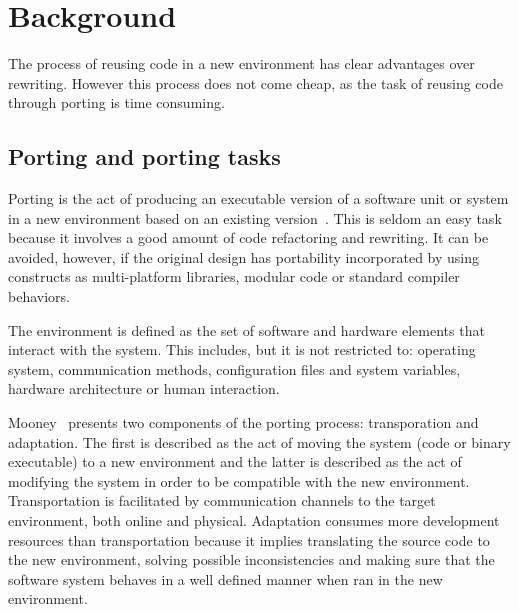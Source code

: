 \section{Background} \label{sec:background}

The process of reusing code in a new environment has clear advantages over
rewriting. However this process does not come cheap, as the task of reusing code
through porting is time consuming.

\subsection{Porting and porting tasks}

Porting is the act of producing an executable version of a software unit or
system in a new environment based on an existing version~\cite{b7}. This is
seldom an easy task because it involves a good amount of code refactoring and
rewriting. It can be avoided, however, if the original design has portability
incorporated by using constructs as multi-platform libraries, modular code or
standard compiler behaviors.

The environment is defined as the set of software and hardware elements that
interact with the system. This includes, but it is not restricted to: operating
system, communication methods, configuration files and system variables,
hardware architecture or human interaction. 

Mooney~\cite{b7} presents two components of the porting process: transporation
and adaptation. The first is described as the act of moving the system (code or
binary executable) to a new environment and the latter is described as the act
of modifying the system in order to be compatible with the new environment.
Transportation is facilitated by communication channels to the target
environment, both online and physical. Adaptation consumes more development
resources than transportation because it implies translating the source code to
the new environment, solving possible inconsistencies and making sure that the
software system behaves in a well defined manner when ran in the new
environment.

